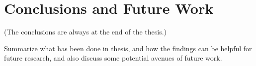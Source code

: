 \chapter{Conclusions and Future Work}
\label{chap::conclusionsandfuturework}

(The conclusions are always at the end of the thesis.)

Summarize what has been done in thesis, and how the findings can be helpful for future research, and also discuss some potential avenues of future work.
